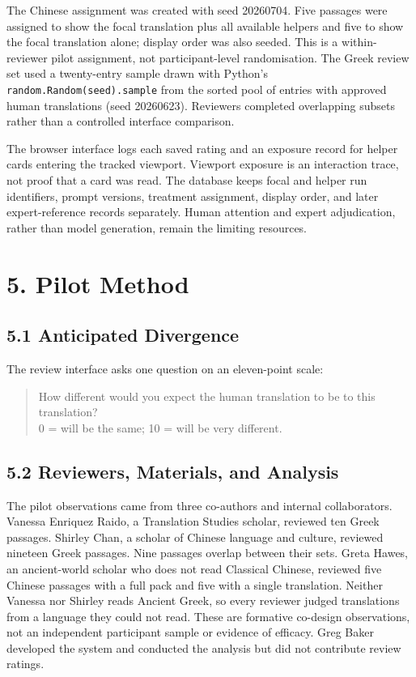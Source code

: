 \documentclass[
  12pt,
]{article}
\begin{document}
The Chinese assignment was created with seed 20260704. Five passages
were assigned to show the focal translation plus all available helpers
and five to show the focal translation alone; display order was also
seeded. This is a within-reviewer pilot assignment, not
participant-level randomisation. The Greek review set used a
twenty-entry sample drawn with Python's
\texttt{random.Random(seed).sample} from the sorted pool of entries with
approved human translations (seed 20260623). Reviewers completed
overlapping subsets rather than a controlled interface comparison.

The browser interface logs each saved rating and an exposure record for
helper cards entering the tracked viewport. Viewport exposure is an
interaction trace, not proof that a card was read. The database keeps
focal and helper run identifiers, prompt versions, treatment assignment,
display order, and later expert-reference records separately. Human
attention and expert adjudication, rather than model generation, remain
the limiting resources.

\section{5. Pilot Method}\label{pilot-method}

\subsection{5.1 Anticipated Divergence}\label{anticipated-divergence}

The review interface asks one question on an eleven-point scale:

\begin{quote}
How different would you expect the human translation to be to this
translation?\\
0 = will be the same; 10 = will be very different.
\end{quote}

\subsection{5.2 Reviewers, Materials, and
Analysis}\label{reviewers-materials-and-analysis}

The pilot observations came from three co-authors and internal
collaborators. Vanessa Enriquez Raido, a Translation Studies scholar,
reviewed ten Greek passages. Shirley Chan, a scholar of Chinese language
and culture, reviewed nineteen Greek passages. Nine passages overlap
between their sets. Greta Hawes, an ancient-world scholar who does not
read Classical Chinese, reviewed five Chinese passages with a full pack
and five with a single translation. Neither Vanessa nor Shirley reads
Ancient Greek, so every reviewer judged translations from a language
they could not read. These are formative co-design
observations, not an independent participant sample or evidence of
efficacy. Greg Baker developed the system and conducted the analysis but
did not contribute review ratings.
\end{document}
